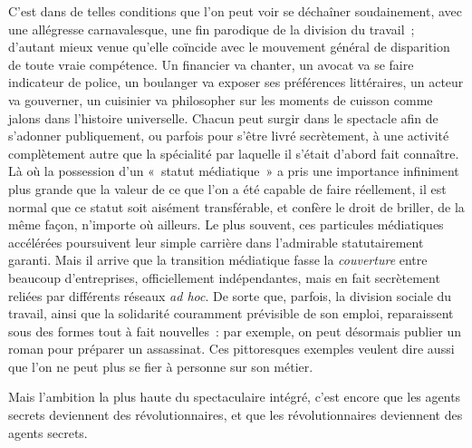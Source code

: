 \documentclass[french,twoside]{book} %
\def\mednobreak{\ifdim\lastskip<\medskipamount
  \removelastskip\nopagebreak\medskip\fi}
\newcommand{\labelblock}[1]{\medbreak{\noindent\color{rubric}\bfseries #1}\par\mednobreak}
\begin{document}
C’est dans de telles conditions que l’on peut voir se déchaîner soudainement, avec une allégresse carnavalesque, une fin parodique de la division du travail ; d’autant mieux venue qu’elle coïncide avec le mouvement général de disparition de toute vraie compétence. Un financier va chanter, un avocat va se faire indicateur de police, un boulanger va exposer ses préférences littéraires, un acteur va gouverner, un cuisinier va philosopher sur les moments de cuisson comme jalons dans l’histoire universelle. Chacun peut surgir dans le spectacle afin de s’adonner publiquement, ou parfois pour s’être livré secrètement, à une activité complètement autre que la spécialité par laquelle il s’était d’abord fait connaître. Là où la possession d’un « statut médiatique » a pris une importance infiniment plus grande que la valeur de ce que l’on a été capable de faire réellement, il est normal que ce statut soit aisément transférable, et confère le droit de briller, de la même façon, n’importe où ailleurs. Le plus souvent, ces particules médiatiques accélérées poursuivent leur simple carrière dans l’admirable statutairement garanti. Mais il arrive que la transition médiatique fasse la \emph{couverture} entre beaucoup d’entreprises, officiellement indépendantes, mais en fait secrètement reliées par différents réseaux \emph{ad hoc}. De sorte que, parfois, la division sociale du travail, ainsi que la solidarité couramment prévisible de son emploi, reparaissent sous des formes tout à fait nouvelles : par exemple, on peut désormais publier un roman pour préparer un assassinat. Ces pittoresques exemples veulent dire aussi que l’on ne peut plus se fier à personne sur son métier.\par
Mais l’ambition la plus haute du spectaculaire intégré, c’est encore que les agents secrets deviennent des révolutionnaires, et que les révolutionnaires deviennent des agents secrets.\par

\labelblock{V}
\end{document}
